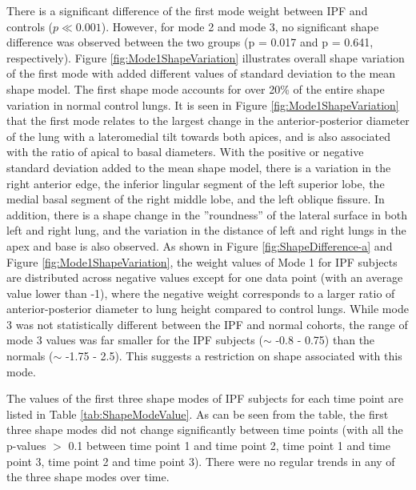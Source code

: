 There is a significant difference of the first mode weight between IPF and controls ($p\ll 0.001$). However, for mode 2 and mode 3, no significant shape difference was observed between the two groups (p = 0.017 and p = 0.641, respectively). Figure \ref{fig:Mode1ShapeVariation} illustrates overall shape variation of the first mode with added different values of standard deviation to the mean shape model. The first shape mode accounts for over 20\% of the entire shape variation in normal control lungs. It is seen in Figure \ref{fig:Mode1ShapeVariation} that the first mode relates to the largest change in the anterior-posterior diameter of the lung with a lateromedial tilt towards both apices, and is also associated with the ratio of apical to basal diameters. With the positive or negative standard deviation added to the mean shape model, there is a variation in the right anterior edge, the inferior lingular segment of the left superior lobe, the medial basal segment of the right middle lobe, and the left oblique fissure. In addition, there is a shape change in the ''roundness'' of the lateral surface in both left and right lung, and the variation in the distance of left and right lungs in the apex and base is also observed. As shown in Figure \ref{fig:ShapeDifference-a} and Figure \ref{fig:Mode1ShapeVariation}, the weight values of Mode 1 for IPF subjects are distributed across negative values except for one data point (with an average value lower than -1), where the negative weight corresponds to a larger ratio of anterior-posterior diameter to lung height compared to control lungs. While mode 3 was not statistically different between the IPF and normal cohorts, the range of mode 3 values was far smaller for the IPF subjects ($\sim$ -0.8 - 0.75) than the normals ($\sim$ -1.75 - 2.5). This suggests a restriction on shape associated with this mode.

The values of the first three shape modes of IPF subjects for each time point are listed in Table \ref{tab:ShapeModeValue}.  As can be seen from the table, the first three shape modes did not change significantly between time points (with all the p-values $>$ 0.1 between time point 1 and time point 2, time point 1 and time point 3, time point 2 and time point 3). There were no regular trends in any of the three shape modes over time. 

